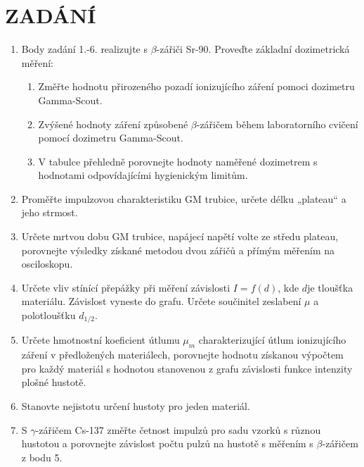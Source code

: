 \documentclass{protokol}
\begin{document}
\section{ZADÁNÍ}\label{kap:zadani}
    \begin{enumerate}
        \item Body zadání 1.-6. realizujte s $\beta$-zářiči Sr-90. Proveďte základní dozimetrická měření:
        
            \begin{enumerate}
                \item Změřte hodnotu přirozeného pozadí ionizujícího záření pomoci dozimetru Gamma-Scout.
                
                \item Zvýšené hodnoty záření způsobené $\beta$-zářičem během laboratorního cvičení pomocí dozimetru Gamma-Scout.
            
                \item V tabulce přehledně porovnejte hodnoty naměřené dozimetrem s hodnotami odpovídajícími hygienickým limitům.
            \end{enumerate}
           
        \item Proměřte impulzovou charakteristiku GM trubice, určete délku „plateau“ \linebreak a jeho strmost.

        \item Určete mrtvou dobu GM trubice, napájecí napětí volte ze středu plateau, porovnejte výsledky získané metodou dvou zářičů a přímým měřením na osciloskopu.

        \item Určete vliv stínící přepážky při měření závislosti $I = f(d)$, kde $d$\linebreak je tloušťka materiálu. Závislost vyneste do grafu. Určete součinitel zeslabení $\mu$  \linebreak a polotloušťku $d_{1/2}$.

        \item Určete hmotnostní koeficient útlumu $\mu_m$ charakterizující útlum ionizujícího záření v předložených materiálech, porovnejte hodnotu získanou výpočtem pro každý materiál s hodnotou stanovenou z grafu závislosti funkce intenzity \linebreak plošné hustotě.

        \item Stanovte nejistotu určení hustoty pro jeden materiál.

        \item S $\gamma$-zářičem Cs-137 změřte četnost impulzů pro sadu vzorků s různou hustotou \linebreak a porovnejte závislost počtu pulzů na hustotě s měřením s $\beta$-zářičem \linebreak z bodu 5.

    \end{enumerate}
\end{document}
